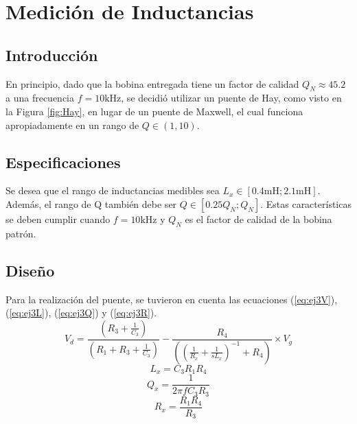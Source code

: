 \chapter{Medición de Inductancias}
    \section{Introducción}
    \label{sec:ej3Intro}
    \begin{figure}[h]
        \begin{center}
            
        \end{center}
        
    \end{figure}
    En principio, dado que la bobina entregada tiene un factor de calidad
    $Q_N\approx45.2$ a una frecuencia $f=10\si{\kilo\hertz}$, se decidió utilizar un
    puente de Hay, como visto en la Figura \ref{fig:Hay}, en lugar de un puente de
    Maxwell, el cual funciona apropiadamente en un rango de $Q\in(1,10)$.
    
    \section{Especificaciones}
    \label{sec:ej3Specs}
    Se desea que el rango de inductancias medibles sea $L_x\in[0.4\si{\milli\henry};
    2.1\si{\milli\henry}]$. Además, el rango de Q también debe ser $Q\in[0.25Q_N; Q_N]$.
    Estas características se deben cumplir cuando $f=10\si{\kilo\hertz}$ y $Q_N$ es
    el factor de calidad de la bobina patrón.
    
    \section{Diseño}
    \label{sec:ej3Design}
    Para la realización del puente, se tuvieron en cuenta las ecuaciones (\ref{eq:ej3V}),
    (\ref{eq:ej3L}), (\ref{eq:ej3Q}) y (\ref{eq:ej3R}).
    \begin{equation}
        V_d=\frac{(R_3 + \frac{1}{C_3})}{(R_1+R_3 + \frac{1}{C_3})} - \frac{R_4}{((\frac{1}{R_x}+\frac{1}{sL_x})^{-1}+R_4)} \times V_g
        \label{eq:ej3V}
    \end{equation}
    \begin{equation}
        L_x = C_3 R_1 R_4
        \label{eq:ej3L}
    \end{equation}
    \begin{equation}
        Q_x=\frac{1}{2 \pi f C_3 R_3}
        \label{eq:ej3Q}
    \end{equation}
    \begin{equation}
        R_x=\frac{R_1 R_4}{R_3}
        \label{eq:ej3R}
    \end{equation}

